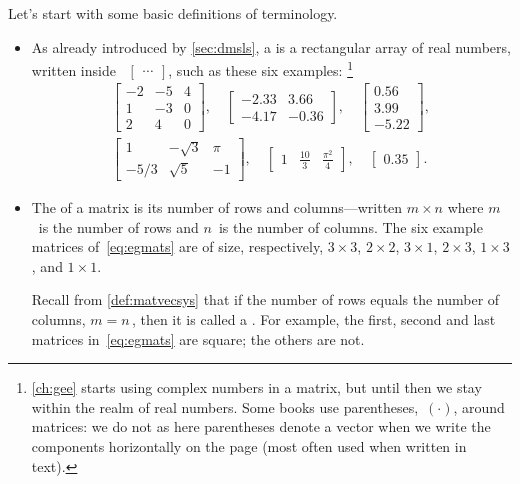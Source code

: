 Let's start with some basic definitions of terminology.
\begin{itemize}
\item As already introduced by \autoref{sec:dmsls}, a  is a rectangular array of real numbers, written inside ~\(\begin{bmatrix} \cdots  \end{bmatrix}\), such as these six examples:
\footnote{\autoref{ch:gee} starts using complex numbers in a matrix, but until then we stay within the realm of real numbers.  Some books use parentheses,~\((\cdot)\), around matrices: we do not as here parentheses denote a vector when we write the components horizontally on the page (most often used when written in text).}
\begin{eqnarray}&&
\begin{bmatrix}   -2 & -5 & 4
\\ 1 & -3 & 0
\\ 2 & 4 & 0 \end{bmatrix},\quad
\begin{bmatrix}   -2.33 & 3.66
\\ -4.17 & -0.36 \end{bmatrix},\quad
\begin{bmatrix}  0.56
\\ 3.99 
\\-5.22 \end{bmatrix},\quad
\nonumber\\&&
\begin{bmatrix}   1 & -\sqrt3 & \pi
\\ -5/3 & \sqrt5 & -1 \end{bmatrix},\quad
\begin{bmatrix}    1 & \frac{10}3 & \frac{\pi^2}4 \end{bmatrix},\quad
\begin{bmatrix} 0.35 \end{bmatrix}.
\qquad\label{eq:egmats}
\end{eqnarray}


\item The  of a matrix is its number of rows and columns---written \(m\times n\) where \(m\)~is the number of rows and \(n\)~is the number of columns.
The six example matrices of~\eqref{eq:egmats} are of size, respectively, \(3\times 3\), \(2\times 2\), \(3\times 1\), \(2\times 3\), \(1\times 3\), and \(1\times 1\).

Recall from \autoref{def:matvecsys} that if the number of rows equals the number of columns, \(m=n\)\,, then it is called a .
For example, the first, second and last matrices in~\eqref{eq:egmats} are square; the others are not.


\end{itemize}

